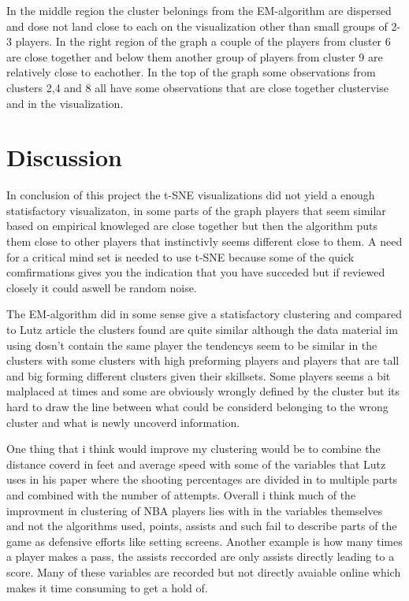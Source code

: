 \documentclass{article}
\begin{document}
In the middle region the cluster belonings from the EM-algorithm are dispersed and dose not land close to each on the visualization other than small groups of 2-3 players. In the right region of the graph a couple of the players from cluster 6 are close together and below them another group of players from cluster 9 are relatively close to eachother. In the top of the graph some observations from clusters 2,4 and 8 all have some observations that are close together clustervise and in the visualization.


\newpage

\section{Discussion}

In conclusion of this project the t-SNE visualizations did not yield a enough statisfactory visualizaton, in some parts of the graph players that seem similar based on empirical knowleged are close together but then the algorithm puts them close to other players that instinctivly seems different close to them. A need for a critical mind set is needed to use t-SNE because some of the quick comfirmations gives you the indication that you have succeded but if reviewed closely it could aswell be random noise. 

The EM-algorithm did in some sense give a statisfactory clustering and compared to Lutz article the clusters found are quite similar although the data material im using dosn't contain the same player the tendencys seem to be similar in the clusters with some clusters with high preforming players and players that are tall and big forming different clusters given their skillsets. Some players seems a bit malplaced at times and some are obviously wrongly defined by the cluster but its hard to draw the line between what could be considerd belonging to the wrong cluster and what is newly uncoverd information. 

One thing that i think would improve my clustering would be to combine the distance coverd in feet and average speed with some of the variables that Lutz uses in his paper where the shooting percentages are divided in to multiple parts and combined with the number of attempts. Overall i think much of the improvment in clustering of NBA players lies with in the variables themselves and not the algorithms used, points, assists and such fail to describe parts of the game as defensive efforts like setting screens. Another example is how many times a player makes a pass, the assists reccorded are only assists directly leading to a score. Many of these variables are recorded but not directly avaiable online which makes it time consuming to get a hold of. 
\end{document}
